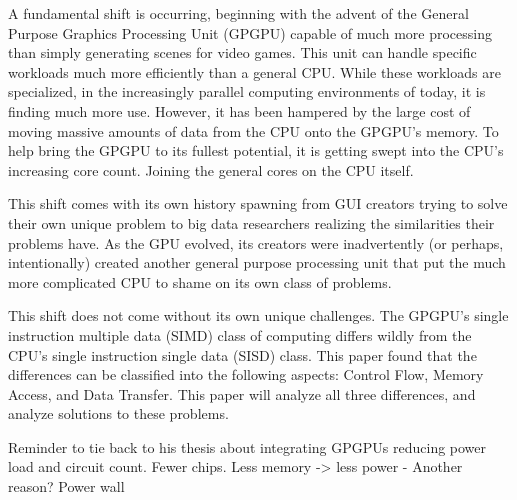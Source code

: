 A fundamental shift is occurring, beginning with the advent of the General Purpose Graphics Processing Unit (GPGPU) capable of much more processing than simply generating scenes for video games. This unit can handle specific workloads much more efficiently than a general CPU. While these workloads are specialized, in the increasingly parallel computing environments of today, it is finding much more use. However, it has been hampered by the large cost of moving massive amounts of data from the CPU onto the GPGPU's memory. To help bring the GPGPU to its fullest potential, it is getting swept into the CPU's increasing core count. Joining the general cores on the CPU itself. 

This shift comes with its own history spawning from GUI creators trying to solve their own unique problem to big data researchers realizing the similarities their problems have. As the GPU evolved, its creators were inadvertently (or perhaps, intentionally) created another general purpose processing unit that put the much more complicated CPU to shame on its own class of problems. 

This shift does not come without its own unique challenges. The GPGPU's single instruction multiple data (SIMD) class of computing differs wildly from the CPU's single instruction single data (SISD) class. This paper found that the differences can be classified into the following aspects: Control Flow, Memory Access, and Data Transfer. This paper will analyze all three differences, and analyze solutions to these problems. 


Reminder to tie back to his thesis about integrating GPGPUs reducing power load and circuit count. 
Fewer chips.
Less memory -> less power
- Another reason? Power wall